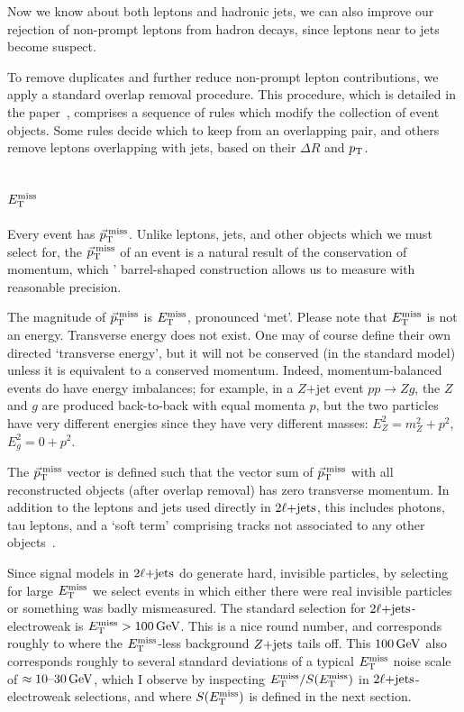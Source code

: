 Now we know about both leptons and hadronic jets, we can also improve our
rejection of non-prompt leptons from hadron decays, since leptons near to jets
become suspect.

To remove duplicates and further reduce non-prompt lepton contributions, we
apply a standard overlap removal procedure.
This procedure, which is detailed in the paper~\cite{atlas2022searches},
comprises a sequence of rules which modify the collection of event objects.
Some rules decide which to keep from an overlapping pair,
and others remove leptons overlapping with jets, based on their $\Delta R$
and $\pt$.


\subsection{$\met$}
Every event has $\ptmiss$.
Unlike leptons, jets, and other objects which we must select for, the $\ptmiss$
of an event is a natural result of the conservation of momentum, which \atlas'
barrel-shaped construction allows us to measure with reasonable precision.

The magnitude of $\ptmiss$ is $\met$, pronounced `met'.
Please note that $\met$ is not an energy.
Transverse energy does not exist.
One may of course define their own directed `transverse energy', but it will
not be conserved (in the standard model) unless it is equivalent to a conserved
momentum.
Indeed, momentum-balanced events do have energy imbalances;
for example, in a $Z\mathrm{+jet}$ event $pp \rightarrow Zg$, the $Z$ and $g$
are produced back-to-back with equal momenta $p$, but the two particles have
very different energies since they have very different masses:
$E_Z^2 = m_Z^2 + p^2$, $E_g^2 = 0 + p^2$.

The $\ptmiss$ vector is defined such that the vector sum of $\ptmiss$ with
all reconstructed objects (after overlap removal) has zero transverse momentum.
In addition to the leptons and jets used directly in $\twoljets$, this includes
photons, tau leptons, and a `soft term' comprising tracks not associated to
any other objects~\cite{atlas_met}.


Since signal models in $\twoljets$ do generate hard, invisible particles,
by selecting for large $\met$ we select events in which either there were real
invisible particles or something was badly mismeasured.
The standard selection for $\twoljets$-electroweak is $\met > 100\,\eV[G]$.
This is a nice round number, and corresponds roughly to where the $\met$-less
background $\zjets$ tails off.
This $100\,\eV[G]$ also corresponds roughly to several standard deviations of
a typical $\met$ noise scale of $\approx 10\textrm{--}30\,\eV[G]$, which I observe
by inspecting $\met / \metsig$ in $\twoljets$-electroweak selections,
and where $\metsig$ is defined in the next section.


